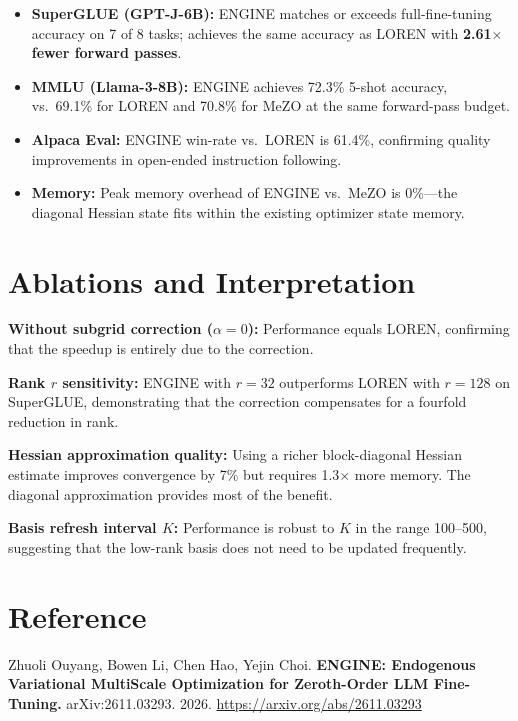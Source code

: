 \documentclass[10pt,twocolumn]{article}
\begin{document}
\begin{itemize}[itemsep=2pt,parsep=0pt]
  \item \textbf{SuperGLUE (GPT-J-6B):} ENGINE matches or exceeds
    full-fine-tuning accuracy on 7 of 8 tasks; achieves the same
    accuracy as LOREN with \textbf{2.61$\times$ fewer forward passes}.
  \item \textbf{MMLU (Llama-3-8B):} ENGINE achieves 72.3\%
    5-shot accuracy, vs.\ 69.1\% for LOREN and 70.8\% for MeZO at the
    same forward-pass budget.
  \item \textbf{Alpaca Eval:} ENGINE win-rate vs.\ LOREN is 61.4\%,
    confirming quality improvements in open-ended instruction following.
  \item \textbf{Memory:} Peak memory overhead of ENGINE vs.\ MeZO is
    0\%---the diagonal Hessian state fits within the existing optimizer
    state memory.
\end{itemize}

\section{Ablations and Interpretation}

\textbf{Without subgrid correction ($\alpha = 0$):} Performance equals
LOREN, confirming that the speedup is entirely due to the correction.

\textbf{Rank $r$ sensitivity:} ENGINE with $r = 32$ outperforms LOREN
with $r = 128$ on SuperGLUE, demonstrating that the correction
compensates for a fourfold reduction in rank.

\textbf{Hessian approximation quality:} Using a richer block-diagonal
Hessian estimate improves convergence by 7\% but requires 1.3$\times$
more memory. The diagonal approximation provides most of the benefit.

\textbf{Basis refresh interval $K$:} Performance is robust to $K$ in
the range 100--500, suggesting that the low-rank basis does not need
to be updated frequently.

\section*{Reference}

Zhuoli Ouyang, Bowen Li, Chen Hao, Yejin Choi.
\textbf{ENGINE: Endogenous Variational MultiScale Optimization for
Zeroth-Order LLM Fine-Tuning.}
arXiv:2611.03293. 2026.
\url{https://arxiv.org/abs/2611.03293}
\end{document}
